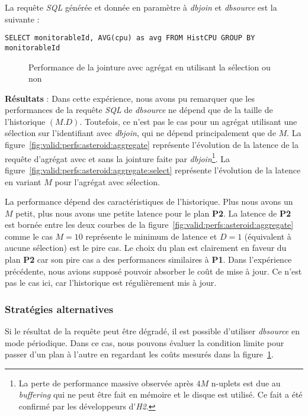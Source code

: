 La requête \textit{SQL} générée et donnée en paramètre à \textit{dbjoin} et \textit{dbsource} est la suivante : 
\begin{lstlisting}
SELECT monitorableId, AVG(cpu) as avg FROM HistCPU GROUP BY monitorableId
\end{lstlisting}

\begin{figure}[ht]
\caption{Performance de la jointure avec agrégat en utilisant la sélection ou non}\label{fig:valid:perfs:asteroid:agg}
\end{figure}

\textbf{Résultats} : Dans cette expérience, nous avons pu remarquer que les performances de la requête \textit{SQL} de \textit{dbsource} ne dépend que de la taille de l'historique $(M.D)$. Toutefois, ce n'est pas le cas pour un agrégat utilisant une sélection sur l'identifiant avec \textit{dbjoin}, qui ne dépend principalement que de $M$. La figure~\ref{fig:valid:perfs:asteroid:aggregate} représente l'évolution de la latence de la requête d'agrégat avec et sans la jointure faite par \textit{dbjoin}\footnote{La perte de performance massive observée après $4M$ n-uplets est due au \textit{buffering} qui ne peut être fait en mémoire et le disque est utilisé. Ce fait a été confirmé par les développeurs d'\textit{H2}.}. La figure~\ref{fig:valid:perfs:asteroid:aggregate:select} représente l'évolution de la latence en variant $M$ pour l'agrégat avec sélection.

La performance dépend des caractéristiques de l'historique. Plus nous avons un $M$ petit, plus nous avons une petite latence pour le plan \textbf{P2}. La latence de \textbf{P2} est bornée entre les deux courbes de la figure~\ref{fig:valid:perfs:asteroid:aggregate} comme le cas $M=10$ représente le minimum de latence et $D=1$ (équivalent à aucune sélection) est le pire cas. Le choix du plan est clairement en faveur du plan \textbf{P2} car son pire cas a des performances similaires à \textbf{P1}. Dans l'expérience précédente, nous avions supposé pouvoir absorber le coût de mise à jour. Ce n'est pas le cas ici, car l'historique est régulièrement mis à jour.

\subsubsection{Stratégies alternatives}
Si le résultat de la requête peut être dégradé, il est possible d'utiliser \textit{dbsource} en mode périodique. Dans ce cas, nous pouvons évaluer la condition limite pour passer d'un plan à l'autre en regardant les coûts mesurés dans la figure~\ref{fig:valid:perfs:asteroid:agg}.

